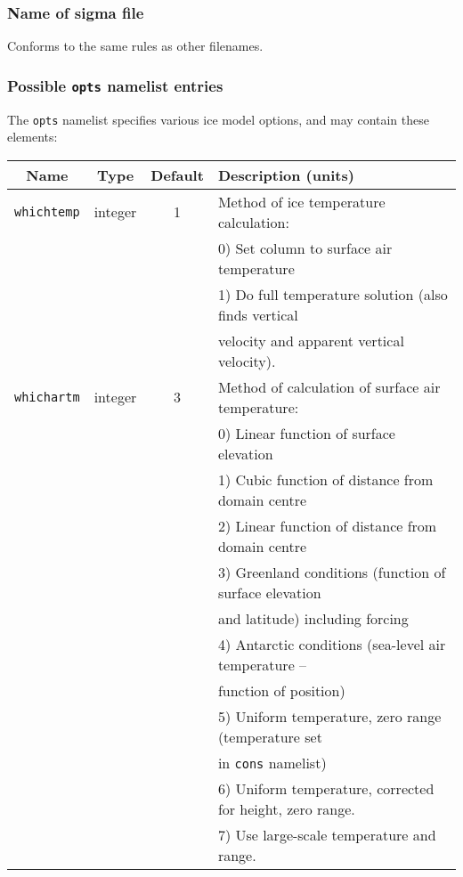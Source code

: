 \documentclass[11pt]{article}
\begin{document}
\subsubsection{Name of sigma file}
%
Conforms to the same rules as other filenames.
%
\subsubsection{Possible \texttt{opts} namelist entries}
%
The \texttt{opts} namelist specifies various ice model options, and may
contain these elements:
%
\begin{center}
\begin{tabular}{|c|c|c|l|}
\hline
Name & Type & Default & Description (units)\\
\hline
\hline
\texttt{whichtemp} & integer & 1 & Method of ice temperature calculation: \\
 & & & 0) Set column to surface air temperature \\
 & & & 1) Do full temperature solution (also finds vertical \\
 & & & velocity and apparent vertical velocity). \\
\hline
\texttt{whichartm} & integer & 3 & Method of calculation of surface air
temperature: \\
 & & & 0) Linear function of surface elevation \\
 & & & 1) Cubic function of distance from domain centre \\
 & & & 2) Linear function of distance from domain centre \\
 & & & 3) Greenland conditions (function of surface elevation \\
 & & & and latitude) including forcing \\
 & & & 4) Antarctic conditions (sea-level air temperature -- \\
 & & & function of position) \\
 & & & 5) Uniform temperature, zero range (temperature set \\
 & & & in \texttt{cons} namelist) \\
 & & & 6) Uniform temperature, corrected for height, zero range. \\
 & & & 7) Use large-scale temperature and range. \\
\hline
\end{tabular}
\end{center}
%
%
\end{document}
